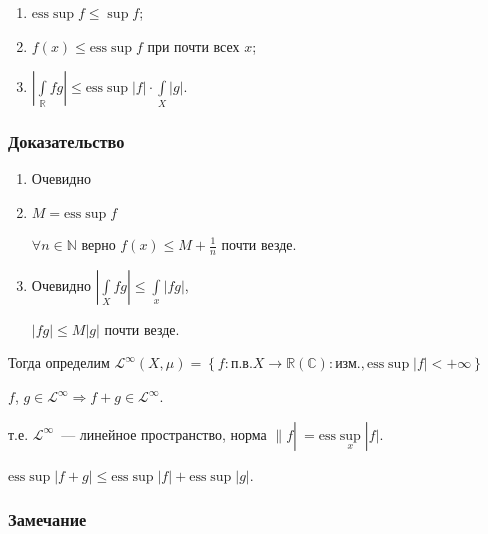 \documentclass{article}
\begin{document}
        \begin{enumerate}
        
            \item $\mathrm{ess} \sup f \leqslant \sup f$;
            
            \item $f(x) \leqslant \mathrm{ess} \sup f$ при почти всех $x$;
            
            \item $\left| \int\limits_\mathbb{R} fg \right| \leqslant \mathrm{ess} \sup |f| \cdot \int\limits_X |g|$.
            
        \end{enumerate}
        
    \subsubsection{Доказательство}
    
        \begin{enumerate}
        
            \item Очевидно
            
            \item $M = \mathrm{ess}\sup f$
            
                $\forall n \in \mathbb{N}$ верно $f(x) \leqslant M + \frac{1}{n}$ почти везде.
            
            \item Очевидно $\left| \int\limits_X fg \right| \leqslant \int\limits_x |fg|$,
            
                $|fg| \leqslant M|g|$ почти везде.
            
        \end{enumerate}
        
    Тогда определим $\mathcal{L}^{\infty} (X, \mu) = \left\{ f : \text{п.в.} X \rightarrow \mathbb{R} (\mathbb{C}) : \text{изм.}, \mathrm{ess}\sup |f| < +\infty \right\}$
    
    $f$, $g \in \mathcal{L}^{\infty} \Rightarrow f + g \in \mathcal{L}^{\infty}$.
    
    т.е. $\mathcal{L}^{\infty}$~--- линейное пространство, норма $\| f |\ = \mathrm{ess}\sup\limits_x |f|$.
    
    $\mathrm{ess}\sup |f + g| \leqslant \mathrm{ess}\sup |f| + \mathrm{ess}\sup |g|$.
    
    \subsubsection{Замечание}
    
\end{document}
